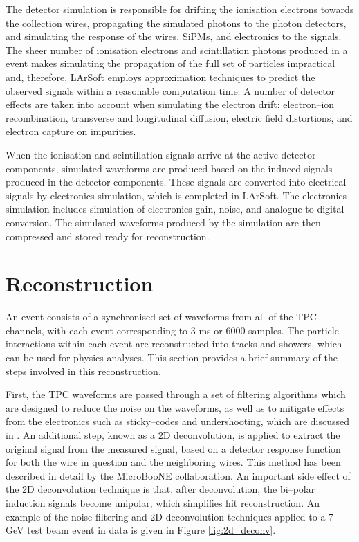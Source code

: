 The detector simulation is responsible for drifting the ionisation electrons 
towards the collection wires, propagating the simulated photons to the photon 
detectors, and simulating the response of the wires, SiPMs, and electronics to 
the signals. The sheer number of ionisation electrons and scintillation 
photons produced in a \protodune{} event makes simulating the propagation of 
the full set of particles impractical and, therefore, LArSoft employs 
approximation techniques to predict the observed signals within a reasonable 
computation time. A number of detector effects are taken into account when 
simulating the electron drift: electron--ion recombination, transverse and 
longitudinal diffusion, electric field distortions, and electron capture on 
impurities. 

When the ionisation and scintillation signals arrive at the active detector 
components, simulated waveforms are produced based on the induced signals 
produced in the detector components. These signals are converted into 
electrical signals by electronics simulation, which is completed in LArSoft. 
The electronics simulation includes simulation of electronics gain, noise, 
and analogue to digital conversion. The simulated waveforms produced by the 
\protodune{} simulation are then compressed and stored ready for reconstruction.

\section{Reconstruction} \label{sec:reconstruction}

An event consists of a synchronised set of waveforms from all of the TPC 
channels, with each event corresponding to 3 ms or 6000 samples. The particle
interactions within each event are reconstructed into tracks and showers, 
which can be used for physics analyses. This section provides a brief summary 
of the steps involved in this reconstruction.

First, the TPC waveforms are passed through a set of filtering algorithms which
are designed to reduce the noise on the waveforms, as well as to mitigate 
effects from the electronics such as sticky--codes and undershooting, which are
discussed in \cite{protoduneperf}. An additional step, known as a 2D 
deconvolution, is applied to extract the original signal from the measured 
signal, based on a detector response function for both the wire in question 
and the neighboring wires. This method has been described in detail by the 
MicroBooNE collaboration\cite{Adams:2018dra}. An important side effect of the 
2D deconvolution technique is that, after deconvolution, the bi--polar 
induction signals become unipolar, which simplifies hit reconstruction. An 
example of the noise filtering and 2D deconvolution techniques applied to a 7 
GeV test beam event in \protodune{} data is given in Figure \ref{fig:2d_deconv}.


